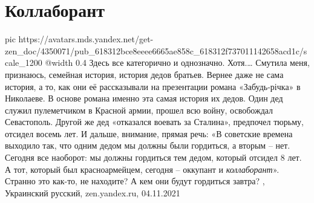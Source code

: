  
 
 
 
 
\chapter{Коллаборант}
\label{sec:slova.kollaborant}

\ifcmt
  pic https://avatars.mds.yandex.net/get-zen_doc/4350071/pub_618312bce8eeee6665ae858c_618312f737011142658acd1c/scale_1200
  @width 0.4
\fi
Здесь все категорично и однозначно. Хотя.… Смутила меня, признаюсь, семейная
история, история дедов братьев. Вернее даже не сама история, а то, как они её
рассказывали на презентации романа «Забудь-річка» в Николаеве. В основе романа
именно эта самая история их дедов.  Один дед служил пулеметчиком в Красной
армии, прошел всю войну, освобождал Севастополь. Другой же дед «отказался
воевать за Сталина», предпочел тюрьму, отсидел восемь лет. И дальше, внимание,
прямая речь: «В советские времена выходило так, что одним дедом мы должны были
гордиться, а вторым – нет. Сегодня все наоборот: мы должны гордиться тем дедом,
который отсидел 8 лет. А тот, который был красноармейцем, сегодня – оккупант и
\emph{коллаборант}».  Странно это как-то, не находите? А кем они будут гордиться
завтра?
, Украинский русский, zen.yandex.ru, 04.11.2021
